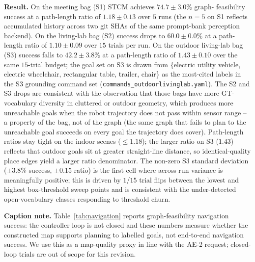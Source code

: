 \noindent\textbf{Result.}
On the meeting bag (S1) STCM achieves $74.7 \pm 3.0\%$ graph-
feasibility success at a path-length ratio of $1.18 \pm 0.13$ over
$5$ runs (the $n{=}5$ on S1 reflects accumulated history across
two git SHAs of the same prompt-bank perception backend). On the
living-lab bag (S2) success drops to $60.0 \pm 0.0\%$ at a path-
length ratio of $1.10 \pm 0.09$ over $15$ trials per run. On the outdoor
living-lab bag (S3) success falls to $42.2 \pm 3.8\%$ at a path-length
ratio of $1.43 \pm 0.10$ over the same $15$-trial budget; the goal
set on S3 is drawn from \{electric utility vehicle, electric
wheelchair, rectangular table, trailer, chair\} as the most-cited
labels in the S3 grounding command set
(\texttt{commands\_outdoorlivinglab.yaml}). The S2 and S3 drops are
consistent with the observation that those bags have more
GT-vocabulary diversity in cluttered or outdoor geometry, which
produces more unreachable goals when the robot trajectory does not
pass within sensor range -- a property of the bag, not of the graph
(the same graph that fails to plan to the unreachable goal succeeds
on every goal the trajectory does cover). Path-length ratios stay
tight on the indoor scenes ($\leq 1.18$); the larger ratio on S3
($1.43$) reflects that outdoor goals sit at greater straight-line
distance, so identical-quality place edges yield a larger ratio
denominator. The non-zero S3 standard deviation
($\pm 3.8\%$ success, $\pm 0.15$ ratio) is the first cell where
across-run variance is meaningfully positive; this is driven by
$1$/$15$ trial flips between the lowest and highest box-threshold
sweep points and is consistent with the under-detected open-vocabulary
classes responding to threshold churn.

\noindent\textbf{Caption note.}
Table~\ref{tab:navigation} reports graph-feasibility navigation
success: the controller loop is not closed and these numbers measure
whether the constructed map supports planning to labelled goals, not
end-to-end navigation success. We use this as a map-quality proxy in
line with the AE-2 request; closed-loop trials are out of scope for
this revision.


